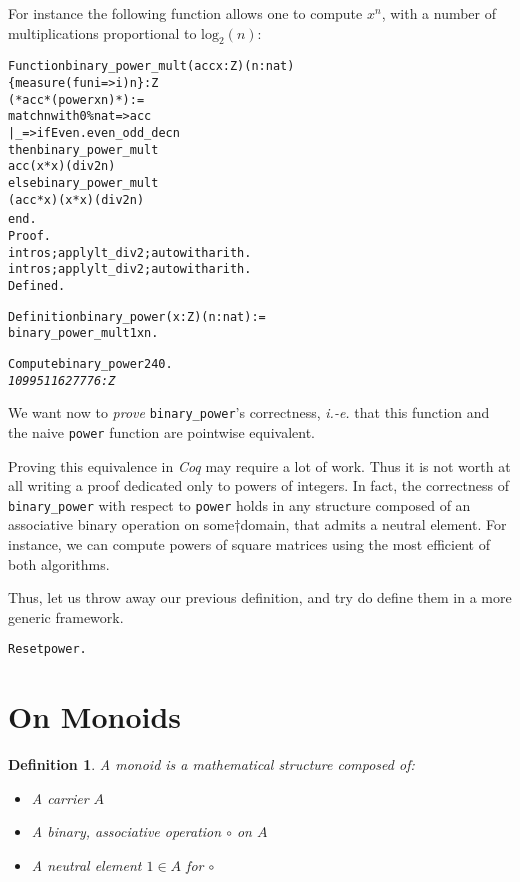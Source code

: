 \documentclass[a4]{report}
\newcommand{\coq}{\mbox{\emph{Coq}}}
\newtheorem{definition}{Definition}[chapter]
\begin{document}
For instance the following function allows one to compute $x^n$, 
with a number of multiplications proportional to $\textrm{log}_2(n)$:


  \begin{alltt}
{Function} binary_power_mult (acc x:Z){(n:nat)}
                \{measure (fun i=>i) n\} : Z
{(* acc * (power x n) *)} :=
 match {{n}} with 0\%nat => acc
             | _ => if Even.even_odd_dec n
                    then  binary_power_mult  
                          acc (x * x) {(div2 n)}
                    else  binary_power_mult 
                         (acc * x) (x * x) {(div2 n)}
  end.{
Proof.
  intros;apply lt_div2; auto with arith.
  intros;apply lt_div2; auto with arith.}
Defined.

Definition binary_power (x:Z)(n:nat) := 
        binary_power_mult 1 x n.

Compute binary_power 2 40.\color{answercolor}\it
1099511627776: Z
\end{alltt}

We want now to \emph{prove} \texttt{binary\_power}'s correctness, \emph{i.-e.}
that this function and the naive \texttt{power} function are pointwise
equivalent.

Proving this equivalence in {\coq} may require a lot of work. 
Thus it is not worth at all writing  a proof dedicated only to powers of
integers. In fact, the correctness of \texttt{binary\_power} with respect to
\texttt{power} holds in any structure composed of an associative binary 
operation on some†domain, that admits a neutral element.
For instance, we can compute powers of square matrices  using the most efficient of both algorithms.


Thus, let us throw away our previous definition, and try do define them
in a more generic framework.

\begin{alltt}
Reset power. 
\end{alltt}


\section{On Monoids}\label{on-monoids}

\begin{definition}
A \emph{monoid} is a mathematical structure composed of:
\begin{itemize}
\item A carrier $A$ 
\item A binary, associative  operation $\circ$ on $A$
\item A neutral element $1\in A$ for $\circ$
\end{itemize}
\end{definition}
\end{document}
